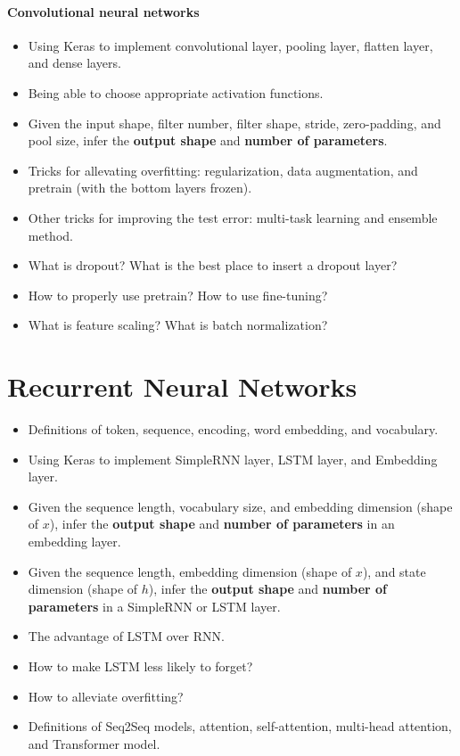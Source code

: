 \documentclass[11pt]{article}
\numberwithin{equation}{section}
\begin{document}
\paragraph{Convolutional neural networks}

\begin{itemize}
	\item
	Using Keras to implement convolutional layer, pooling layer, flatten layer, and dense layers.
	\item
	Being able to choose appropriate activation functions.
	\item
	Given the input shape, filter number, filter shape, stride, zero-padding, and pool size, infer the \textbf{output shape } and \textbf{number of parameters}.
	\item
	Tricks for allevating overfitting: regularization, data augmentation, and pretrain (with the bottom layers frozen).
	\item
	Other tricks for improving the test error: multi-task learning and ensemble method.
	\item
	What is dropout? What is the best place to insert a dropout layer?
	\item
	How to properly use pretrain? How to use fine-tuning?
	\item
	What is feature scaling? What is batch normalization? 
\end{itemize}




\section{Recurrent Neural Networks}

\begin{itemize}
	\item
	Definitions of token, sequence, encoding, word embedding, and vocabulary.
	\item
	Using Keras to implement SimpleRNN layer, LSTM layer, and Embedding layer.
	\item
	Given the sequence length, vocabulary size, and embedding dimension (shape of $x$), infer the \textbf{output shape} and \textbf{number of parameters} in an embedding layer.
	\item
	Given the sequence length, embedding dimension (shape of $x$), and state dimension (shape of $h$), infer the \textbf{output shape} and \textbf{number of parameters} in a SimpleRNN or LSTM layer.
	\item
	The advantage of LSTM over RNN.
	\item
	How to make LSTM less likely to forget?
	\item
	How to alleviate overfitting?
	\item
	Definitions of Seq2Seq models, attention, self-attention, multi-head attention, and Transformer model.
\end{itemize}
\end{document}
